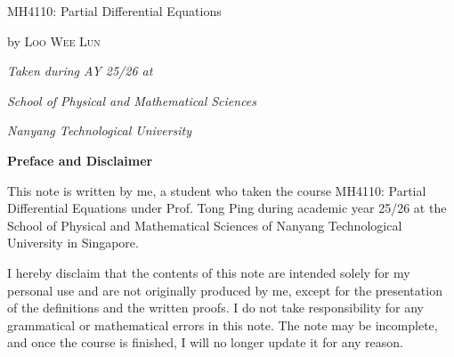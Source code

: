 \documentclass{book}
\theoremstyle{definition}
\begin{document}
\begin{titlepage}
        \centering
        \hfill\par
        \vspace{4\baselineskip}
        {\Huge 
        MH4110: Partial Differential Equations}
        \vspace{4\baselineskip}
        
        {by \Large\textsc{Loo Wee Lun}\par}
        \vfill
        \em Taken during AY 25/26 at\par
        {\em School of Physical and Mathematical Sciences} \par
        {\em Nanyang Technological University}
\end{titlepage}

\tableofcontents

\newpage
\textbf{Preface and Disclaimer}


This note is written by me, a student who taken the course MH4110: Partial Differential Equations under Prof. Tong Ping during academic year 25/26 at the School of Physical and Mathematical Sciences of Nanyang Technological University in Singapore. 

I hereby disclaim that the contents of this note are intended solely for my personal use and are not originally produced by me, except for the presentation of the definitions and the written proofs. I do not take responsibility for any grammatical or mathematical errors in this note. The note may be incomplete, and once the course is finished, I will no longer update it for any reason.


\newpage






\end{document}
